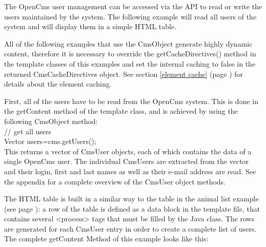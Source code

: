 The OpenCms user management can be accessed via the API to read or
write the users maintained by the system. The following example will
read all users of the system and will display them in a simple HTML
table. 

All of the following examples that use the CmsObject generate highly dynamic
content, therefore it is necessary to override the {\meth getCacheDirectives()} 
method in the template classes of this examples and set the internal caching
to false in the returned {\class CmsCacheDirectives} 
object. See section \ref{element cache} (page \pageref{element cache})
for details about the element caching.

First, all of the users have to be read from the OpenCms system. This
is done in the {\meth getContent} method of the template class, and is achieved
by using the following {\meth CmsObject} method:\\


{\meth // get all users\\

Vector users=cms.getUsers();}\\

This returns a vector of {\name CmsUser} objects, each of which contains the
data of a single OpenCms user. The individual {\name CmsUsers} are extracted from the
vector and their login, first and last names as well as their e-mail
address are read. See the appendix for a complete overview of the
{\name CmsUser} object methods.

The HTML table is built in a similar way to the table in the animal
list example (see page \pageref{animal list example}): 
a row of the table is defined as a data block in the
template file, that contains several {\tag <process>} tags that must be
filled by the Java class. The rows are generated for each {\name CmsUser}
entry in order to create a complete list of users.\\

The complete getContent Method of this example looks like this:\\

